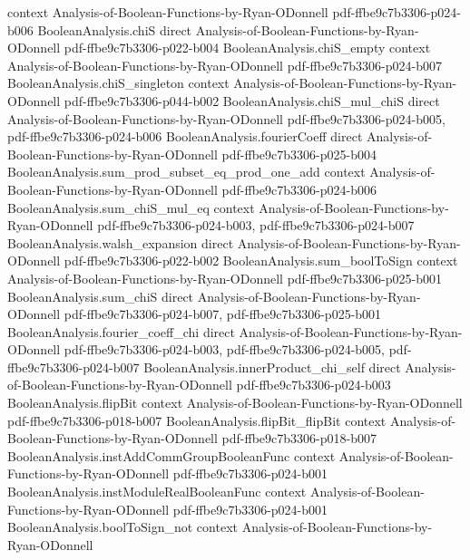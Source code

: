 \begin{lemma}
  {context}
  {Analysis-of-Boolean-Functions-by-Ryan-ODonnell}
  {pdf-ffbe9c7b3306-p024-b006}
\proofstep
  {BooleanAnalysis.chiS}
  {direct}
  {Analysis-of-Boolean-Functions-by-Ryan-ODonnell}
  {pdf-ffbe9c7b3306-p022-b004}
\proofstep
  {BooleanAnalysis.chiS_empty}
  {context}
  {Analysis-of-Boolean-Functions-by-Ryan-ODonnell}
  {pdf-ffbe9c7b3306-p024-b007}
\proofstep
  {BooleanAnalysis.chiS_singleton}
  {context}
  {Analysis-of-Boolean-Functions-by-Ryan-ODonnell}
  {pdf-ffbe9c7b3306-p044-b002}
\proofstep
  {BooleanAnalysis.chiS_mul_chiS}
  {direct}
  {Analysis-of-Boolean-Functions-by-Ryan-ODonnell}
  {pdf-ffbe9c7b3306-p024-b005,
    pdf-ffbe9c7b3306-p024-b006}
\proofstep
  {BooleanAnalysis.fourierCoeff}
  {direct}
  {Analysis-of-Boolean-Functions-by-Ryan-ODonnell}
  {pdf-ffbe9c7b3306-p025-b004}
\proofstep
  {BooleanAnalysis.sum_prod_subset_eq_prod_one_add}
  {context}
  {Analysis-of-Boolean-Functions-by-Ryan-ODonnell}
  {pdf-ffbe9c7b3306-p024-b006}
\proofstep
  {BooleanAnalysis.sum_chiS_mul_eq}
  {context}
  {Analysis-of-Boolean-Functions-by-Ryan-ODonnell}
  {pdf-ffbe9c7b3306-p024-b003,
    pdf-ffbe9c7b3306-p024-b007}
\proofstep
  {BooleanAnalysis.walsh_expansion}
  {direct}
  {Analysis-of-Boolean-Functions-by-Ryan-ODonnell}
  {pdf-ffbe9c7b3306-p022-b002}
\proofstep
  {BooleanAnalysis.sum_boolToSign}
  {context}
  {Analysis-of-Boolean-Functions-by-Ryan-ODonnell}
  {pdf-ffbe9c7b3306-p025-b001}
\proofstep
  {BooleanAnalysis.sum_chiS}
  {direct}
  {Analysis-of-Boolean-Functions-by-Ryan-ODonnell}
  {pdf-ffbe9c7b3306-p024-b007,
    pdf-ffbe9c7b3306-p025-b001}
\proofstep
  {BooleanAnalysis.fourier_coeff_chi}
  {direct}
  {Analysis-of-Boolean-Functions-by-Ryan-ODonnell}
  {pdf-ffbe9c7b3306-p024-b003,
    pdf-ffbe9c7b3306-p024-b005,
    pdf-ffbe9c7b3306-p024-b007}
\proofstep
  {BooleanAnalysis.innerProduct_chi_self}
  {direct}
  {Analysis-of-Boolean-Functions-by-Ryan-ODonnell}
  {pdf-ffbe9c7b3306-p024-b003}
\proofstep
  {BooleanAnalysis.flipBit}
  {context}
  {Analysis-of-Boolean-Functions-by-Ryan-ODonnell}
  {pdf-ffbe9c7b3306-p018-b007}
\proofstep
  {BooleanAnalysis.flipBit_flipBit}
  {context}
  {Analysis-of-Boolean-Functions-by-Ryan-ODonnell}
  {pdf-ffbe9c7b3306-p018-b007}
\proofstep
  {BooleanAnalysis.instAddCommGroupBooleanFunc}
  {context}
  {Analysis-of-Boolean-Functions-by-Ryan-ODonnell}
  {pdf-ffbe9c7b3306-p024-b001}
\proofstep
  {BooleanAnalysis.instModuleRealBooleanFunc}
  {context}
  {Analysis-of-Boolean-Functions-by-Ryan-ODonnell}
  {pdf-ffbe9c7b3306-p024-b001}
\proofstep
  {BooleanAnalysis.boolToSign_not}
  {context}
  {Analysis-of-Boolean-Functions-by-Ryan-ODonnell}

\end{lemma}
